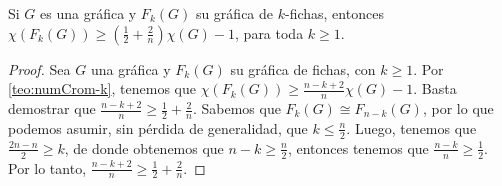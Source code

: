 \begin{teorema}
\label{teo:numCrom indep-k}
    Si $G$ es una gr\'afica y $F_k(G)$ su gr\'afica de $k$-fichas, entonces
    \linebreak
    $\chi (F_k(G)) \geq (\frac{1}{2}+ \frac{2}{n})\chi(G) -1 $, para toda $k
    \geq 1$.
\end{teorema}
    
\begin{proof}
    Sea $G$ una gr\'afica y $F_k(G)$ su gr\'afica de fichas, con $k \geq 1$. Por
    \cref{teo:numCrom-k}, tenemos que $\chi(F_k(G)) \geq \frac{n-k+2}{n} \chi(G)
    -1$. Basta demostrar que $\frac{n-k+2}{n} \geq \frac{1}{2}+\frac{2}{n}$.
    Sabemos que $F_k(G) \cong F_{n-k}(G)$, por lo que podemos asumir, sin
    p\'erdida de generalidad, que $k\leq \frac{n}{2}$. Luego, tenemos que
    $\frac{2n-n}{2}\geq k$, de donde obtenemos que $n-k \geq \frac{n}{2}$,
    entonces tenemos que $\frac{n-k}{n}\geq \frac{1}{2}$. Por lo tanto,
    $\frac{n-k+2}{n} \geq \frac{1}{2}+\frac{2}{n}$.
\end{proof}